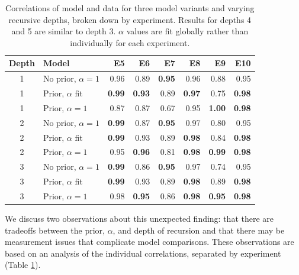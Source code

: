 \documentclass[man,noapacite]{apa2}
\begin{document}
\begin{table}[ht]
\centering
\begin{tabular}{clrrrrrr}
  \hline
Depth & Model & E5 & E6 & E7 & E8 & E9 & E10 \\
  \hline
  1 & No prior, $\alpha=1$ & 0.96 & 0.89 & {\bf 0.95} & 0.96 & 0.88 & 0.95 \\
    1 & Prior, $\alpha$ fit & {\bf 0.99} & {\bf 0.93} & 0.89 & {\bf 0.97} & 0.75 & {\bf 0.98} \\
    1 & Prior, $\alpha=1$ & 0.87 & 0.87 & 0.67 & 0.95 & {\bf 1.00} & {\bf 0.98} \\
  \hline
    2 & No prior, $\alpha=1$ & {\bf 0.99} & 0.87 & {\bf 0.95} & 0.97 & 0.80 & 0.95 \\
    2 & Prior, $\alpha$ fit & {\bf 0.99} & 0.93 & 0.89 & {\bf 0.98} & 0.84 & {\bf 0.98} \\
    2 & Prior, $\alpha=1$ & 0.95 & {\bf 0.96} & 0.81 & {\bf 0.98} & {\bf 0.99} & {\bf 0.98} \\
  \hline
    3 & No prior, $\alpha=1$ & {\bf 0.99} & 0.86 & {\bf 0.95} & 0.97 & 0.74 & 0.95 \\
    3 & Prior, $\alpha$ fit & {\bf 0.99} & 0.93 & 0.89 & {\bf 0.98} & 0.89 & {\bf 0.98} \\
    3 & Prior, $\alpha=1$ & 0.98 & {\bf 0.95} & 0.86 & {\bf 0.98} & {\bf 0.95} & {\bf 0.98} \\
  \hline
\end{tabular}
\caption{\label{tab:expts-corrs} Correlations of model and data for three model variants and varying recursive depths, broken down by experiment. Results for depths 4 and 5 are similar to depth 3. $\alpha$ values are fit globally rather than individually for each experiment.}
\end{table}

We discuss two observations about this unexpected finding: that there are tradeoffs between the prior, $\alpha$, and depth of recursion and that there may be measurement issues that complicate model comparisons. These observations are based on an analysis of the individual correlations, separated by experiment (Table \ref{tab:expts-corrs}).
\end{document}
